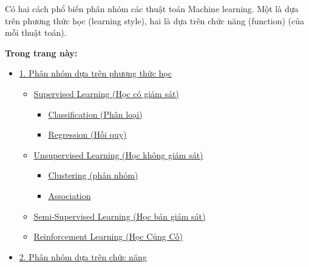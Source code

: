 Có hai cách phổ biến phân nhóm các thuật toán Machine learning. Một là
dựa trên phương thức học (learning style), hai là dựa trên chức năng
(function) (của mỗi thuật toán).

\textbf{Trong trang này:}

\begin{itemize}
\tightlist
\item
  \protect\hyperlink{-phan-nhom-dua-tren-phuong-thuc-hoc}{1. Phân nhóm
  dựa trên phương thức học}

  \begin{itemize}
  \tightlist
  \item
    \protect\hyperlink{supervised-learning-hoc-co-giam-sat}{Supervised
    Learning (Học có giám sát)}

    \begin{itemize}
    \tightlist
    \item
      \protect\hyperlink{classification-phan-loai}{Classification (Phân
      loại)}
    \item
      \protect\hyperlink{regression-hoi-quy}{Regression (Hồi quy)}
    \end{itemize}
  \item
    \protect\hyperlink{unsupervised-learning-hoc-khong-giam-sat}{Unsupervised
    Learning (Học không giám sát)}

    \begin{itemize}
    \tightlist
    \item
      \protect\hyperlink{clustering-phan-nhom}{Clustering (phân nhóm)}
    \item
      \protect\hyperlink{association}{Association}
    \end{itemize}
  \item
    \protect\hyperlink{semi-supervised-learning-hoc-ban-giam-sat}{Semi-Supervised
    Learning (Học bán giám sát)}
  \item
    \protect\hyperlink{reinforcement-learning-hoc-cung-co}{Reinforcement
    Learning (Học Củng Cố)}
  \end{itemize}
\item
  \protect\hyperlink{-phan-nhom-dua-tren-chuc-nang}{2. Phân nhóm dựa
  trên chức năng}


\end{itemize}
